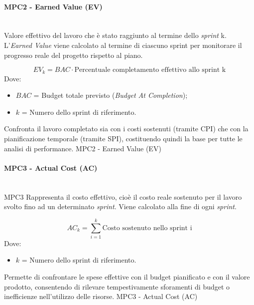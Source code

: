 \documentclass[10pt, letterpaper]{article}
\newcommand{\trisubsection}[1]{\paragraph{#1}\mbox{}\\}
\begin{document}
\trisubsection{MPC2 - Earned Value (EV)}
\label{sec:MPC2}
{Valore effettivo del lavoro che è stato raggiunto al termine dello \textit{sprint} k.
    L'\textit{Earned Value} viene calcolato al termine di ciascuno sprint per monitorare il progresso
    reale del progetto rispetto al piano.}
{\[ EV_k = BAC \cdot \mbox{Percentuale completamento effettivo allo sprint k} \] Dove:
    \begin{itemize}
        \item $BAC$ = Budget totale previsto (\textit{Budget At Completion});
        \item $k$ = Numero dello sprint di riferimento.
    \end{itemize}
}
{Confronta il lavoro completato sia con i costi
    sostenuti (tramite CPI) che con la pianificazione temporale
    (tramite SPI), costituendo quindi la base per tutte le analisi di performance.}
{MPC2 - Earned Value (EV)}

\trisubsection{MPC3 - Actual Cost (AC)}
\label{sec:MPC3}
\Metrica
{MPC3}
{Rappresenta il costo effettivo, cioè il costo reale sostenuto per il lavoro svolto
    fino ad un determinato \textit{sprint}. Viene calcolato alla fine di ogni \textit{sprint}.}
{\[ AC_k = \sum_{i=1}^{k} \mbox{Costo sostenuto nello sprint i} \]
    Dove:
    \begin{itemize}
        \item $k$ = Numero dello sprint di riferimento.
    \end{itemize}
}
{Permette di confrontare le spese effettive
    con il budget pianificato e con il valore prodotto, consentendo di rilevare
    tempestivamente sforamenti di budget o inefficienze nell'utilizzo
    delle risorse.}
{MPC3 - Actual Cost (AC)}
\end{document}
